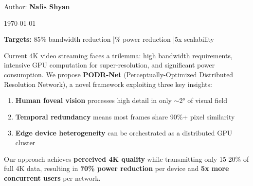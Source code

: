 \documentclass[11pt, a4paper]{article}
\begin{document}
\begin{titlepage}
\begin{center}
        \vspace{1.5cm}

        {\Large\sffamily Author: \textbf{Nafis Shyan}}

        \vspace{0.5cm}

        {\large\sffamily\color{codegray}\today}

        \vfill

        \begin{tcolorbox}[
            enhanced,
            colback=secondarygreen!10,
            colframe=secondarygreen,
            width=0.85\textwidth,
            arc=2mm,
            boxrule=1pt
        ]
        \centering\small\sffamily
        \textbf{Targets:} 85\% bandwidth reduction \quad|\% power reduction \quad|\quad 5x scalability
        \end{tcolorbox}

    \end{center}
\end{titlepage}

\begin{tcolorbox}[
    enhanced,
    colback=lightbg,
    colframe=sectioncolor,
    fonttitle=\Large\bfseries\sffamily,
    title={Abstract},
    rounded corners=all,
    boxrule=1.5pt,
    top=10pt, bottom=10pt
]
Current 4K video streaming faces a trilemma: high bandwidth requirements, intensive GPU computation for super-resolution, and significant power consumption. We propose \textbf{PODR-Net} (Perceptually-Optimized Distributed Resolution Network), a novel framework exploiting three key insights:

\begin{enumerate}[label=\textcolor{primaryblue}{\arabic*.}, leftmargin=*]
    \item \textbf{Human foveal vision} processes high detail in only $\sim$2° of visual field
    \item \textbf{Temporal redundancy} means most frames share 90\%+ pixel similarity
    \item \textbf{Edge device heterogeneity} can be orchestrated as a distributed GPU cluster
\end{enumerate}

\begin{resultbox}
Our approach achieves \textbf{perceived 4K quality} while transmitting only 15-20\% of full 4K data, resulting in \textbf{70\% power reduction} per device and \textbf{5x more concurrent users} per network.
\end{resultbox}
\end{tcolorbox}
\end{document}
